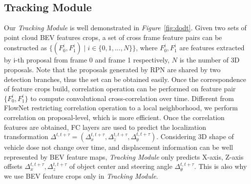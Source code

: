 \documentclass[letterpaper, 10 pt, conference]{ieeeconf}  %
\def\figurename{\emph{Figure}}
\begin{document}
\subsection{Tracking Module}
Our \textit{Tracking Module} is well demonstrated in \figurename \, \ref{fig:dodt}. Given two sets of point cloud BEV features crops, a set of cross frame feature pairs can be constructed as $\{(F_0^i, F_1^i)\mid i \in \{0,1,...,N\}\}$, where $F_0^i, F_1^i$ are features extracted by i-th proposal from frame 0 and frame 1 respectively, $N$ is the number of 3D proposals. Note that the proposals generated by RPN are shared by two detection branches, thus the set can be obtained easily. Once the correspondence of feature crops build, correlation operation can be performed on feature pair $\{F_0^i, F_1^i\}$ to compute convolutional cross-correlation over time. Different from FlowNet \cite{dosovitskiy2015flownet} restricting correlation operation to a local neighborhood, we perform correlation on proposal-level, which is more efficient. Once the correlation features are obtained, FC layers are used to predict the localization transformation $\Delta^{t, t+\tau} = (\Delta^{t,t+\tau}_{x}, \Delta^{t,t+\tau}_{z}, \Delta^{t,t+\tau}_{\theta})$. Considering 3D shape of vehicle dose not change over time, and displacement information can be well represented by BEV feature maps, \textit{Tracking Module} only predicts X-axis, Z-axis offsets $\Delta^{t,t+\tau}_{x}, \Delta^{t,t+\tau}_{z}$ of object center and steering angle  $\Delta^{t,t+\tau}_{\theta}$. This is also why we use BEV feature crops only in \textit{Tracking Module}. 
\end{document}
